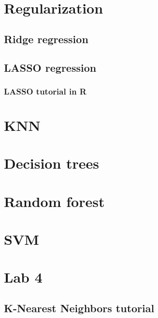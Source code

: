 \documentclass[
]{book}
\begin{document}
\hypertarget{regularization}{%
\section{Regularization}\label{regularization}}

\hypertarget{ridge-regression}{%
\subsection{Ridge regression}\label{ridge-regression}}

\hypertarget{lasso-regression}{%
\subsection{LASSO regression}\label{lasso-regression}}

\hypertarget{lasso-tutorial-in-r}{%
\subsubsection{LASSO tutorial in R}\label{lasso-tutorial-in-r}}

\hypertarget{knn}{%
\section{KNN}\label{knn}}

\hypertarget{decision-trees}{%
\section{Decision trees}\label{decision-trees}}

\hypertarget{random-forest}{%
\section{Random forest}\label{random-forest}}

\hypertarget{svm}{%
\section{SVM}\label{svm}}

\hypertarget{lab-4}{%
\section{Lab 4}\label{lab-4}}

\hypertarget{k-nearest-neighbors-tutorial}{%
\subsection{K-Nearest Neighbors tutorial}\label{k-nearest-neighbors-tutorial}}
\end{document}
